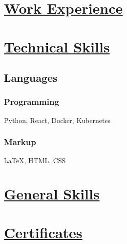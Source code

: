 \documentclass{article}
\renewcommand{\maketitle}{
\begin{document}
{\huge\bfseries
\theauthor}

\vspace{0.75em}

\noindent\hspace{0.0em} \faEnvelopeO \, reshavabraham@gmail.com \, \faGithub \, reshav-abraham@github --- 

\noindent\hspace{0.0em} \faLinkedin \, https://www.linkedin.com/in/reshav-abraham-ab8016a5/

\noindent\hspace{-0.1em} \faHome \, 160 Vroom Street, Jersey City

\noindent\hspace{0em} \faPhone \, 908-731-1426
	
\end{center}
}

\begin{document}
\section{\underline{Work Experience}}
\section{\underline{Technical Skills}}

\subsection{Languages}
\vspace{-0.3em}



\subsubsection{Programming}
Python, React, Docker, Kubernetes
\vspace{0.3em}

\subsubsection{Markup}
{\LaTeX}, HTML, CSS
\section{\underline{General Skills}}
\section{\underline{Certificates}}
\end{document}
